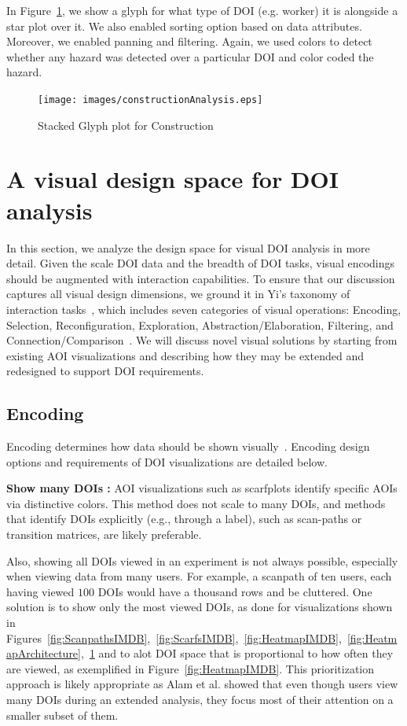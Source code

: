 In Figure~\ref{fig:constructionAnalysis}, we show a glyph for what type of DOI (e.g. worker) it is alongside a star plot over it. We also enabled sorting option based on data attributes. Moreover, we enabled panning and filtering. Again, we used colors to detect whether any hazard was detected over a particular DOI and color coded the hazard. 
\begin{figure}
  \centering
  \texttt{[image: images/constructionAnalysis.eps]}
  \caption{Stacked Glyph plot for Construction}
	\label{fig:constructionAnalysis}
\end{figure}

\section{A visual design space for DOI analysis}

In this section, we analyze the design space for visual DOI analysis in more detail. Given the scale DOI data and the breadth of DOI tasks, visual encodings should be augmented with interaction capabilities. To ensure that our discussion captures all visual design dimensions, we ground it in Yi's taxonomy of interaction tasks~\cite{Yi07}, which includes seven categories of visual operations: Encoding, Selection, Reconfiguration, Exploration, Abstraction/Elaboration, Filtering, and Connection/Comparison~\cite{Yi07}. We will discuss novel visual solutions by starting from existing AOI visualizations and describing how they may be extended and redesigned to support DOI requirements. 

\subsection{Encoding}
\label{sec:Encoding}
Encoding determines how data should be shown visually~\cite{Yi07}. Encoding design options and requirements of DOI visualizations are detailed below.

\noindent \textbf{Show many DOIs :} AOI visualizations such as scarfplots identify specific AOIs via distinctive colors. This method does not scale to many DOIs, and methods that identify DOIs explicitly (e.g., through a label), such as scan-paths or transition matrices, are likely preferable. 

Also, showing all DOIs viewed in an experiment is not always possible, especially when viewing data from many users. For example, a scanpath of ten users, each having viewed $100$ DOIs would have a thousand rows and be cluttered. One solution is to show only the most viewed DOIs, as done for visualizations shown in Figures~\ref{fig:ScanpathsIMDB},~\ref{fig:ScarfsIMDB},~\ref{fig:HeatmapIMDB},~\ref{fig:HeatmapArchitecture},~\ref{fig:constructionAnalysis} and to alot DOI space that is proportional to how often they are viewed, as exemplified in Figure~\ref{fig:HeatmapIMDB}. This prioritization approach is likely appropriate as Alam et al. showed that even though users view many DOIs during an extended analysis, they focus most of their attention on a smaller subset of them. 

